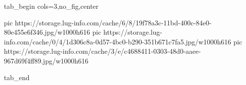 
 
 
 
 


\ifcmt
  tab_begin cols=3,no_fig,center

     pic https://storage.lug-info.com/cache/6/8/19f78a3c-11bd-400c-84e0-80e455e6f346.jpg/w1000h616
     pic https://storage.lug-info.com/cache/0/4/1d306c8a-0d57-4bc0-b290-351b671c7fa5.jpg/w1000h616
     pic https://storage.lug-info.com/cache/3/e/c4688411-0303-48d0-aaee-967d69f4ff89.jpg/w1000h616

  tab_end
\fi
